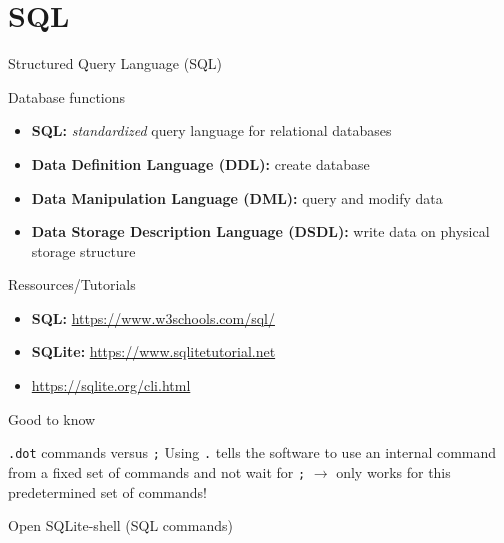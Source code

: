 
\section{SQL}

\begin{frame}{Structured Query Language (SQL)}
\begin{block}{Database functions}
\begin{itemize}
    \item \textbf{SQL:} \emph{standardized} query language for relational databases
    \item \textbf{Data Definition Language (DDL):} create database
    \item \textbf{Data Manipulation Language (DML):} query and modify data 
    \item \textbf{Data Storage Description Language (DSDL):} write data on physical storage structure
\end{itemize}
\end{block}

\begin{exampleblock}{Ressources/Tutorials}
\begin{itemize}\footnotesize
    \item  \textbf{SQL:} \protect\url{ https://www.w3schools.com/sql/ }
    \item  \textbf{SQLite:} \protect\url{https://www.sqlitetutorial.net }
    \item \protect\url{https://sqlite.org/cli.html}
\end{itemize}
\end{exampleblock}


\begin{alertblock}{Good to know}
\end{alertblock}


\begin{alertblock}{\texttt{.dot} commands versus \texttt{;}}
\footnotesize
Using \texttt{.} tells the software to use an internal command from a fixed set of commands and not wait for \texttt{;} $\to$ only works for this predetermined set of commands!
\end{alertblock}

\begin{alertblock}{Open SQLite-shell (SQL commands)}
\end{alertblock}


\end{frame}
